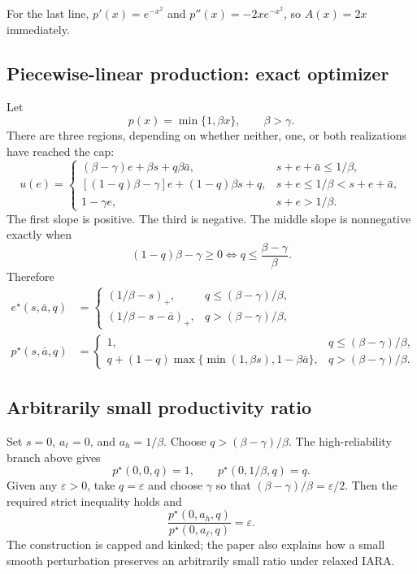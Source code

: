 \documentclass[11pt]{article}
\theoremstyle{tutorial}
\theoremstyle{remark}
\newcommand{\1}{\mathbb{I}}
\newcommand{\pos}[1]{\left(#1\right)_{+}}
\begin{document}
For the last line, $p'(x)=e^{-x^2}$ and $p''(x)=-2xe^{-x^2}$, so $A(x)=2x$ immediately.

\subsection{Piecewise-linear production: exact optimizer}

Let
\[
  p(x)=\min\{1,\beta x\},\qquad \beta>\gamma.
\]
There are three regions, depending on whether neither, one, or both realizations have reached the cap:
\[
u(e)=\begin{cases}
(\beta-\gamma)e+\beta s+q\beta\bar a,
&s+e+\bar a\le1/\beta,\\
[(1-q)\beta-\gamma]e+(1-q)\beta s+q,
&s+e\le1/\beta<s+e+\bar a,\\
1-\gamma e,&s+e>1/\beta.
\end{cases}
\]
The first slope is positive.  The third is negative.  The middle slope is nonnegative exactly when
\[
(1-q)\beta-\gamma\ge0
\iff q\le\frac{\beta-\gamma}{\beta}.
\]
Therefore
\begin{align*}
e^\star(s,\bar a,q)&=
\begin{cases}
\pos{1/\beta-s},&q\le(\beta-\gamma)/\beta,\\
\pos{1/\beta-s-\bar a},&q>(\beta-\gamma)/\beta,
\end{cases}\\
p^\star(s,\bar a,q)&=
\begin{cases}
1,&q\le(\beta-\gamma)/\beta,\\
q+(1-q)\max\{\min(1,\beta s),1-\beta\bar a\},
&q>(\beta-\gamma)/\beta.
\end{cases}
\end{align*}

\subsection{Arbitrarily small productivity ratio}

Set $s=0$, $a_\ell=0$, and $a_h=1/\beta$.  Choose
$q>(\beta-\gamma)/\beta$.  The high-reliability branch above gives
\[
p^\star(0,0,q)=1,
\qquad
p^\star(0,1/\beta,q)=q.
\]
Given any $\varepsilon>0$, take $q=\varepsilon$ and choose $\gamma$ so that
$(\beta-\gamma)/\beta=\varepsilon/2$.  Then the required strict inequality holds and
\[
\frac{p^\star(0,a_h,q)}{p^\star(0,a_\ell,q)}=\varepsilon.
\]
The construction is capped and kinked; the paper also explains how a small smooth perturbation preserves an
arbitrarily small ratio under relaxed IARA.
\end{document}
